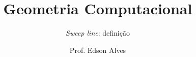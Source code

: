 \title{Geometria Computacional}
\subtitle{\textit{Sweep line}: definição} 
\date{}
\author{Prof. Edson Alves}

